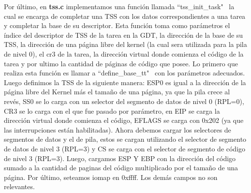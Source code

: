 \documentclass[a4paper]{article}
\begin{document}
Por último, en \textbf{tss.c} implementamos una función llamada ``tss_init_task" \, la cual se encarga de completar una TSS con los datos correspondientes a una tarea y completar la base de su descriptor. Esta función toma como parámetros el índice del descriptor de TSS de la tarea en la GDT, la dirección de la base de su TSS, la dirección de una página libre del kernel (la cual sera utilizada para la pila de nivel $0$), el cr3 de la tarea, la dirección virtual donde comienza el código de la tarea y por ultimo la cantidad de páginas de código que posee.
\justify
Lo primero que realiza esta función es llamar a  ``define_base_tt" \ con los parámetros adecuados. Luego definimos la TSS de la siguiente manera: ESP0 es igual a la dirección de la página libre del Kernel más el tamaño de una página, ya que la pila crece al revés, SS0 se lo carga con un selector del segmento de datos de nivel 0 (RPL=0), CR3 se lo carga con el que fue pasado por parámetro, en EIP se carga la dirección virtual donde comienza el código, EFLAGS se carga con 0x202 (ya que las interrupciones están habilitadas). Ahora debemos cargar los selectores de segmentos de datos y el de pila, estos se cargan utilizando el selector de segmento de datos de nivel 3 (RPL=3) y CS se carga con el selector de segmento de código de nivel 3 (RPL=3). Luego,  cargamos ESP Y EBP con la dirección del código sumado a la cantidad de paginas del código multiplicado por el tamaño de una página. Por último, seteamos iomap en 0xffff. Los demás campos no son relevantes. 
\end{document}
